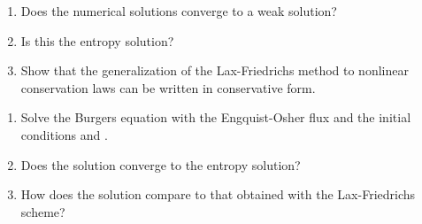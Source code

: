 \documentclass{article}
\begin{document}
\begin{exerciseList}
\begin{enumerate}
\item
Does the numerical solutions converge to a weak solution?

\item
Is this the entropy solution?

\item
Show that the generalization of the Lax-Friedrichs method to nonlinear conservation laws can be written in conservative form.
\end{enumerate}

\item
\begin{enumerate}
\item
Solve the Burgers equation with the Engquist-Osher flux and the initial conditions  and .

\item
Does the solution converge to the entropy solution?

\item
How does the solution compare to that obtained with the Lax-Friedrichs scheme?

\end{enumerate}



\end{exerciseList}
\end{document}
